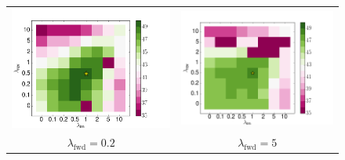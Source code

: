 \documentclass[11pt,a4paper]{article}
\begin{document}
\begin{figure}
\begin{tabular}{c c}
\includegraphics[scale=0.36]{0_1.png} & \includegraphics[scale=0.36]{2.png} \\
$\lambda_\text{fwd} = 0.2$ & $\lambda_\text{fwd} = 5$ \\

\end{tabular}
\end{figure}
\end{document}
